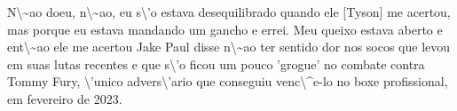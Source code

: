 \documentclass{article}%
\begin{document}
\newline%
N\textbackslash{}\textasciitilde{}ao doeu, n\textbackslash{}\textasciitilde{}ao, eu s\textbackslash{}'o estava desequilibrado quando ele {[}Tyson{]} me acertou, mas porque eu estava mandando um gancho e errei. Meu queixo estava aberto e ent\textbackslash{}\textasciitilde{}ao ele me acertou\newline%
\newline%
Jake Paul disse n\textbackslash{}\textasciitilde{}ao ter sentido dor nos socos que levou em suas lutas recentes e que s\textbackslash{}'o ficou um pouco 'grogue' no combate contra Tommy Fury, \textbackslash{}'unico advers\textbackslash{}'ario que conseguiu venc\textbackslash{}\^{}e{-}lo no boxe profissional, em fevereiro de 2023.\newline%
\newline%

%
\end{document}
